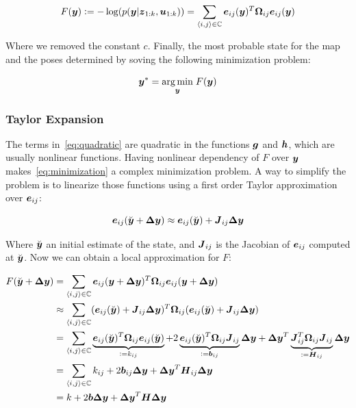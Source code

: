 \begin{equation}
F(\boldsymbol{y}) \vcentcolon= -\log(p(\boldsymbol{y}|\boldsymbol{z}_{1:k},\boldsymbol{u}_{1:k})) = \sum_{\left<i,j\right>\in\mathbb{C}}\boldsymbol{e}_{ij}(\boldsymbol{y})^T\boldsymbol{\Omega}_{ij} \boldsymbol{e}_{ij}(\boldsymbol{y}) 
\label{eq:simplified}
\end{equation}

\noindent
Where we removed the constant $c$. Finally, the most probable state for the map and the poses determined by soving the following minimization problem: 

\begin{equation}
\boldsymbol{y}^* = \underset{\boldsymbol{y}}{\arg\min} \;F(\boldsymbol{y})
\label{eq:minimization}
\end{equation}

\subsubsection{Taylor Expansion}

The terms in~\eqref{eq:quadratic} are quadratic in the functions $\boldsymbol{g}$ and $\boldsymbol{h}$, which are usually nonlinear functions. Having nonlinear dependency of $F$ over $\boldsymbol{y}$ makes~\eqref{eq:minimization} a complex minimization problem. A way to simplify the problem is to linearize those functions using a first order Taylor approximation over $\boldsymbol{e}_{ij}$:

\begin{equation}
\boldsymbol{e}_{ij}(\breve{\boldsymbol{y}}+\boldsymbol{\Delta y}) \approx \boldsymbol{e}_{ij}(\breve{\boldsymbol{y}}) + \boldsymbol{J}_{ij}\boldsymbol{\Delta y}
\end{equation}

Where $\breve{\boldsymbol{y}}$ an initial estimate of the state, and $\boldsymbol{J}_{ij}$ is the Jacobian of $\boldsymbol{e}_{ij}$ computed at $\breve{\boldsymbol{y}}$. Now we can obtain a local approximation for $F$:

\begin{align}
F(\breve{\boldsymbol{y}}+\boldsymbol{\Delta y}) &= \sum_{\left<i,j\right>\in\mathbb{C}}
\boldsymbol{e}_{ij}(\boldsymbol{y}+\boldsymbol{\Delta y})^T\boldsymbol{\Omega}_{ij} 
\boldsymbol{e}_{ij}(\boldsymbol{y}+\boldsymbol{\Delta y}) \notag \\
& \approx \sum_{\left<i,j\right>\in\mathbb{C}} 
(\boldsymbol{e}_{ij}(\breve{\boldsymbol{y}}) + \boldsymbol{J}_{ij}\boldsymbol{\Delta y})^T \boldsymbol{\Omega}_{ij}
(\boldsymbol{e}_{ij}(\breve{\boldsymbol{y}}) + \boldsymbol{J}_{ij}\boldsymbol{\Delta y})\notag \\
&= \sum_{\left<i,j\right>\in\mathbb{C}}
\underbrace{\boldsymbol{e}_{ij}(\breve{\boldsymbol{y}})^T\boldsymbol{\Omega}_{ij}\boldsymbol{e}_{ij}(\breve{\boldsymbol{y}})}_{\vcentcolon= k_{ij}}
+2\underbrace{\boldsymbol{e}_{ij}(\breve{\boldsymbol{y}})^T\boldsymbol{\Omega}_{ij}\boldsymbol{J}_{ij}}_{ \vcentcolon= \boldsymbol{b}_{ij}}\boldsymbol{\Delta y}
+\boldsymbol{\Delta y}^T
\underbrace{\boldsymbol{J}_{ij}^T\boldsymbol{\Omega}_{ij}\boldsymbol{J}_{ij}}_{\vcentcolon= \boldsymbol{H}_{ij}}
\boldsymbol{\Delta y} \notag \\
&= \sum_{\left<i,j\right>\in\mathbb{C}} k_{ij} + 2\boldsymbol{b}_{ij}\boldsymbol{\Delta y} + \boldsymbol{\Delta y}^T \boldsymbol{H}_{ij} \boldsymbol{\Delta y} \notag \\
&= k + 2\boldsymbol{b} \boldsymbol{\Delta y} + \boldsymbol{\Delta y}^T \boldsymbol{H} \boldsymbol{\Delta y}
\label{eq:linearized}
\end{align}

